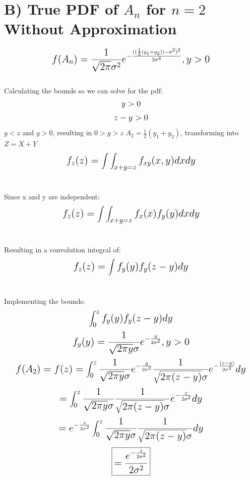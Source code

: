 \documentclass{article}
\begin{document}
\section*{B) True PDF of $A_n$ for $n=2$ Without Approximation}
\[
\mathlarger{\mathlarger{f({A_n}) = \frac{1}{\sqrt{2\pi}\sigma^2}e^{-\frac{((\frac{1}{2}(y_1+y_2))-\sigma^2)^2}{2\sigma^4}}, y>0}}
\]
\\
Calculating the bounds so we can solve for the pdf:
\[
\mathlarger{y > 0}
\]
\[
\mathlarger{z - y > 0}
\]
\center $y<z$ and $y>0$, resulting in $0 > y > z$
\center $A_2 = \frac{1}{2}(y_1+y_2)$, transforming into $Z = X + Y$
\\
\[
\mathlarger{\mathlarger{f_z(z)=\int\int_{x+y=z}f_{xy}(x,y)dxdy}}
\]
\\
\raggedright Since x and y are independent:
\[
\mathlarger{\mathlarger{f_z(z)=\int\int_{x+y=z}f_x(x)f_y(y)dxdy}}
\]
\\
\raggedright Resulting in a convolution integral of:
\[
\mathlarger{\mathlarger{f_z(z)=\int f_y(y)f_y(z-y)dy}}
\]
\\
\raggedright Implementing the bounds:
\vspace{0.35cm}
\[
\mathlarger{\mathlarger{\int_{0}^{z}f_y(y)f_y(z-y)dy}}
\]
\vspace{0.5cm}
\[
\mathlarger{\mathlarger{f_y(y)= \frac{1}{\sqrt{2\pi y}\sigma}e^{-\frac{y}{2\sigma^2}}, y>0}}
\vspace{1cm}
\]
\[
\mathlarger{\mathlarger{f(A_2)=f(z)=\int_{0}^{z}\frac{1}{\sqrt{2\pi y}\sigma}e^{-\frac{y}{2\sigma^2}}\frac{1}{\sqrt{2\pi (z-y)}\sigma}e^{-\frac{(z-y)}{2\sigma^2}}dy}}
\]
\vspace{0.5cm}
\[
\mathlarger{\mathlarger{=\int_{0}^{z}\frac{1}{\sqrt{2\pi y}\sigma}\frac{1}{\sqrt{2\pi (z-y)}\sigma}e^{-\frac{z}{2\sigma^2}}dy}}
\]
\vspace{0.5cm}
\[
\mathlarger{\mathlarger{=e^{-\frac{z}{2\sigma^2}}\int_{0}^{z}\frac{1}{\sqrt{2\pi y}\sigma}\frac{1}{\sqrt{2\pi (z-y)}\sigma}dy}}
\]
\vspace{0.5cm}
\[
\mathlarger{\mathlarger{\boxed{=\frac{e^{-\frac{z}{2\sigma^2}}}{2\sigma^2}}}}
\]

\newpage
\vspace*{1cm}
\end{document}
